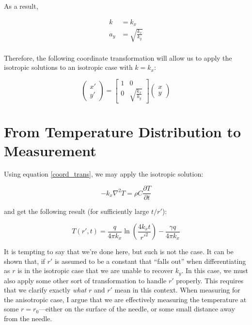 As a result,

\begin{align*}
k &= k_x\\ a_y &= \sqrt{\frac{k_x}{k_y}}\\
\end{align*}

Therefore, the following coordinate transformation will allow us to apply the
isotropic solutions to an isotropic case with \(k = k_x\):

\begin{equation}
    \label{coord_trans}
    \begin{pmatrix}x' \\ y'\end{pmatrix} =
    \begin{bmatrix}1 & 0\\ 0 & \sqrt{\frac{k_x}{k_y}} \end{bmatrix}\begin{pmatrix}x \\ y\end{pmatrix}
\end{equation}

\section{From Temperature Distribution to Measurement}

Using equation \ref{coord_trans}, we may apply the isotropic solution:

\begin{equation}
    -k_x \nabla^2 T = \rho C\frac{\partial T}{\partial t}
\end{equation}

and get the following result (for sufficiently large \(t/r'\)):

\begin{equation}
T(r',t) = \frac{q}{4\pi k_x}\ln\left(\frac{4k_xt}{r'^2}\right) - \frac{\gamma q}{4\pi k_x}
\end{equation}

It is tempting to say that we're done here, but such is not the case. It can be
shown that, if \(r'\) is assumed to be a constant that ``falls out'' when 
differentiating as \(r\) is in the isotropic case that we are unable to recover
\(k_y\). In this case, we must also apply some other sort of transformation to
handle \(r'\) properly. This requires that we clarify exactly \emph{what} \(r\)
and \(r'\) mean in this context. When measuring for the anisotropic case, I
argue that we are effectively measuring the temperature at some
\(r = r_{\textrm{0}}\)---either on the surface of the needle, or some small
distance away from the needle.

